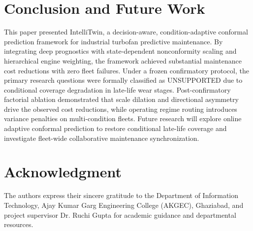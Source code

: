 \documentclass[conference,a4paper]{IEEEtran}
\begin{document}
\section{Conclusion and Future Work}

This paper presented IntelliTwin, a decision-aware, condition-adaptive conformal prediction framework for industrial turbofan predictive maintenance. By integrating deep prognostics with state-dependent nonconformity scaling and hierarchical engine weighting, the framework achieved substantial maintenance cost reductions with zero fleet failures. Under a frozen confirmatory protocol, the primary research questions were formally classified as UNSUPPORTED due to conditional coverage degradation in late-life wear stages. Post-confirmatory factorial ablation demonstrated that scale dilation and directional asymmetry drive the observed cost reductions, while operating regime routing introduces variance penalties on multi-condition fleets. Future research will explore online adaptive conformal prediction to restore conditional late-life coverage and investigate fleet-wide collaborative maintenance synchronization.

\section*{Acknowledgment}
The authors express their sincere gratitude to the Department of Information Technology, Ajay Kumar Garg Engineering College (AKGEC), Ghaziabad, and project supervisor Dr. Ruchi Gupta for academic guidance and departmental resources.
\end{document}
